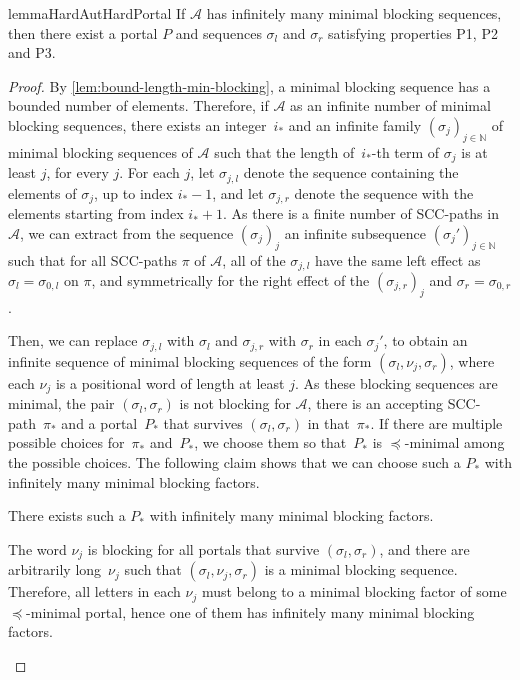 \documentclass[letterpaper, USenglish, cleveref, autoref, thm-restate, numberwithinsect]{lipics-v2021}
\theoremstyle{theorem}
\theoremstyle{definition}
\newcommand{\Aa}{\mathcal{A}}
\newcommand{\leqportals}{\preceq}
\newcommand{\NN}{\mathbb{N}}
\newcommand{\SCCpath}{\pi}
\begin{document}
\begin{restatable}{lemma}{HardAutHardPortal}
	\label{lem:hard-aut-to-hard-portal}
	If $\Aa$ has infinitely many minimal blocking sequences, then there exist a portal $P$ and sequences $\sigma_l$ and $\sigma_r$ satisfying properties P1, P2 and P3.
\end{restatable}
\begin{proof}
	By \cref{lem:bound-length-min-blocking}, a minimal blocking sequence has a bounded number of elements.
	Therefore, if $\Aa$ as an infinite number of minimal blocking sequences, there exists an integer~$i_*$ and an infinite family $(\sigma_j)_{j\in\NN}$ of minimal blocking sequences of $\Aa$ such that the length of~$i_*$-th term of $\sigma_j$ is at least $j$, for every $j$. 
	For each $j$, let $\sigma_{j, l}$ denote the sequence containing the elements of $\sigma_j$, up to index $i_*-1$,
	and let $\sigma_{j, r}$ denote the sequence with the elements starting from index $i_* + 1$.
	As there is a finite number of SCC-paths in $\Aa$, we can extract from the sequence $(\sigma_j)_j$ an infinite subsequence $(\sigma_j')_{j\in \NN}$ such that for all SCC-paths $\SCCpath$ of $\Aa$,  all of the $\sigma_{j, l}$ have the same left effect as $\sigma_l = \sigma_{0, l}$ on $\SCCpath$, and symmetrically for the right effect of the $(\sigma_{j, r})_j$ and $\sigma_r = \sigma_{0, r}$.

	Then, we can replace $\sigma_{j, l}$ with $\sigma_{l}$ and $\sigma_{j, r}$ with $\sigma_{r}$ in each $\sigma_j'$, to obtain an infinite sequence of minimal blocking sequences of the form $(\sigma_l, \nu_j, \sigma_r)$, where each $\nu_j$ is a positional word of length at least $j$.
	As these blocking sequences are minimal, the pair $(\sigma_{l}, \sigma_{r})$ is not blocking for $\Aa$, there is an accepting SCC-path~$\SCCpath_*$ and a portal~$P_*$ that survives $(\sigma_{l}, \sigma_{r})$ in that~$\SCCpath_*$.
	If there are multiple possible choices for~$\SCCpath_*$ and~$P_*$, we choose them so that~$P_*$ is $\leqportals$-minimal among the possible choices.
	The following claim shows that we can choose such a $P_*$ with infinitely many minimal blocking factors.

	\begin{claim}
		There exists such a $P_*$ with infinitely many minimal blocking factors.
	\end{claim}
	\begin{claimproof}
		The word $\nu_j$ is blocking for all portals that survive $(\sigma_{l}, \sigma_{r})$, and there are arbitrarily long~$\nu_j$ such that $(\sigma_l, \nu_j, \sigma_r)$ is a minimal blocking sequence.
		Therefore, all letters in each $\nu_j$ must belong to a minimal blocking factor of some $\leqportals$-minimal portal, hence one of them has infinitely many minimal blocking factors.
	\end{claimproof}


\end{proof}
\end{document}

